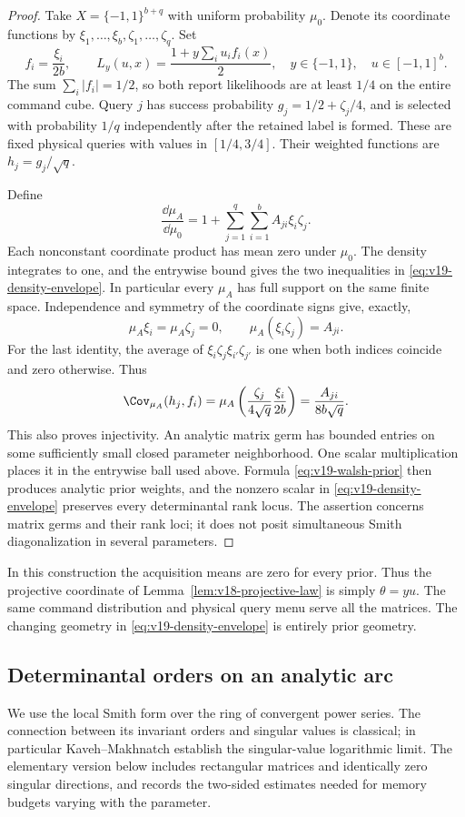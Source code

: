 \begin{proof}
Take $X=\{-1,1\}^{b+q}$ with uniform probability $\mu_0$. Denote
its coordinate functions by $\xi_1,\ldots,\xi_b,\zeta_1,\ldots,\zeta_q$.
Set
\[
 f_i=\frac{\xi_i}{2b},\qquad
 L_y(u,x)=\frac{1+y\sum_i u_i f_i(x)}2,
 \quad y\in\{-1,1\},\quad u\in[-1,1]^b.
\]
The sum $\sum_i|f_i|=1/2$, so both report likelihoods are at least
$1/4$ on the entire command cube. Query $j$ has success probability
$g_j=1/2+\zeta_j/4$, and is selected with probability $1/q$
independently after the retained label is formed. These are fixed
physical queries with values in $[1/4,3/4]$. Their weighted functions
are $h_j=g_j/\sqrt q$.

Define
\begin{equation}\label{eq:v19-walsh-prior}
 \frac{\dd\mu_A}{\dd\mu_0}
       =1+\sum_{j=1}^q\sum_{i=1}^b A_{ji}\xi_i\zeta_j.
\end{equation}
Each nonconstant coordinate product has mean zero under $\mu_0$.
The density integrates to one, and the entrywise bound gives the two
inequalities in \eqref{eq:v19-density-envelope}. In particular every
$\mu_A$ has full support on the same finite space. Independence and
symmetry of the coordinate signs give, exactly,
\[
 \mu_A\xi_i=\mu_A\zeta_j=0,\qquad
 \mu_A(\xi_i\zeta_j)=A_{ji}.
\]
For the last identity, the average of
$\xi_i\zeta_j\xi_{i'}\zeta_{j'}$ is one when both indices coincide
and zero otherwise. Thus
\[
 \Cov_{\mu_A}(h_j,f_i)
   =\mu_A\left(\frac{\zeta_j}{4\sqrt q}
                       \frac{\xi_i}{2b}\right)
   =\frac{A_{ji}}{8b\sqrt q}.
\]
This also proves injectivity. An analytic matrix germ has bounded
entries on some sufficiently small closed parameter neighborhood.
One scalar multiplication places it in the entrywise ball used above.
Formula \eqref{eq:v19-walsh-prior} then produces analytic prior
weights, and the nonzero scalar in \eqref{eq:v19-density-envelope}
preserves every determinantal rank locus. The assertion concerns
matrix germs and their rank loci; it does not posit simultaneous
Smith diagonalization in several parameters.
\end{proof}

In this construction the acquisition means are zero for every prior.
Thus the projective coordinate of Lemma~\ref{lem:v18-projective-law}
is simply $\theta=yu$. The same command distribution and physical
query menu serve all the matrices. The changing geometry in
\eqref{eq:v19-density-envelope} is entirely prior geometry.

\subsection{Determinantal orders on an analytic arc}
We use the local Smith form over the ring of convergent power series.
The connection between its invariant orders and singular values is
classical; in particular Kaveh--Makhnatch
\cite[Theorem 1.1 and Section 6]{KavehMakhnatch} establish the
singular-value logarithmic limit. The elementary version below includes
rectangular matrices and identically zero singular directions, and
records the two-sided estimates needed for memory budgets varying
with the parameter.

